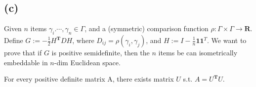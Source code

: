 \documentclass[twoside,11pt]{homework}
\begin{document}
\subsection*{(c)}

Given $n$ items $\gamma_i.\cdots, \gamma_n \in \Gamma$, and a (symmetric) comparison function $\rho: \Gamma \times \Gamma \rightarrow \mathbf{R}$. Define $G:=-\frac{1}{2}H^{\mathbf{T}}DH$, where $D_{ij}=\rho(\gamma_i,\gamma_j)$, and $H:=I-\frac{1}{n}\mathbf{1}\mathbf{1}^T$. We want to prove that if $G$ is positive semidefinite, then the $n$ items be can isometrically embeddable in $n$-dim Euclidean space.


\begin{lemma}
For every positive definite matrix A, there exists matrix $U$ s.t. $A = U^\mathbf{T}U$.
\end{lemma}
\end{document}

